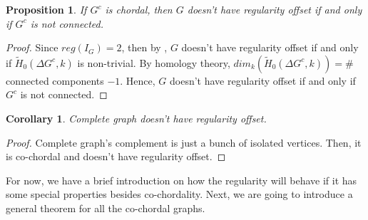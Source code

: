 \documentclass[dvipsnames,10pt]{article}
\newtheorem{proposition}[theorem]{Proposition}
\newtheorem{cor}[theorem]{Corollary}
\begin{document}
\begin{proposition}
    If $G^c$ is chordal, then $G$ doesn't have regularity offset if and only if $G^c$ is not connected.
\end{proposition}

\begin{proof}
    Since $reg(I_G)=2$, then by , $G$ doesn't have regularity offset if and only if $\widetilde{H}_{0}\left(\Delta G^c, k\right)$ is non-trivial. By homology theory, $dim_k(\widetilde{H}_{0}\left(\Delta G^c, k\right))=\#$ connected components $-1$. Hence, $G$ doesn't have regularity offset if and only if $G^c$ is not connected.
\end{proof}

\begin{cor}
    Complete graph doesn't have regularity offset.
\end{cor}
\begin{proof}
    Complete graph's complement is just a bunch of isolated vertices. Then, it is co-chordal and doesn't have regularity offset. 
\end{proof}

For now, we have a brief introduction on how the regularity will behave if it has some special properties besides co-chordality. Next, we are going to introduce a general theorem for all the co-chordal graphs.
\end{document}
